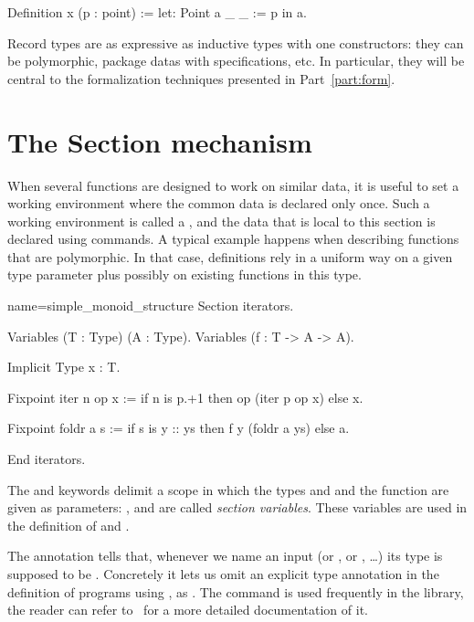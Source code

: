 \begin{coq}{}{}
Definition x (p : point) := let: Point a _ _ := p in a.
\end{coq}

Record types are as expressive as inductive types with one
constructors: they can be polymorphic, package datas with
specifications, etc. In particular, they will be central to the
formalization techniques presented in Part~\ref{part:form}.


\section{The Section mechanism}\label{sec:section}
When several functions are designed to work on similar data, it is
useful to set a working environment where the common data is declared
only once.  Such a working environment is called a , and
the data that is local to this section is declared using 
commands.  A typical example happens when describing functions that
are polymorphic. In that case, definitions rely in a uniform way on a
given type parameter plus possibly on existing functions in this type.


\begin{coq}{name=simple_monoid_structure}{}
Section iterators.

Variables (T : Type) (A : Type).
Variables (f : T -> A -> A).

Implicit Type x : T.

Fixpoint iter n op x :=
  if n is p.+1 then op (iter p op x) else x.

Fixpoint foldr a s :=
  if s is y :: ys then f y (foldr a ys) else a.

End iterators.
\end{coq}
The  and  keywords delimit a scope in which
the types  and  and the function  are given as
parameters: ,  and  are called \emph{section
  variables}.  These variables
are used in the definition of  and . 

The  annotation 
tells \Coq{} that, whenever we name
an input  (or , or , \ldots) its type is supposed to be
.  Concretely it lets us omit an explicit type annotation
in the definition of programs using , as .
The   command is used frequently in the
\mcbMC{} library, the reader can refer to~\cite[section 2.7.18]{Coq:manual}
for a more detailed documentation of it.

